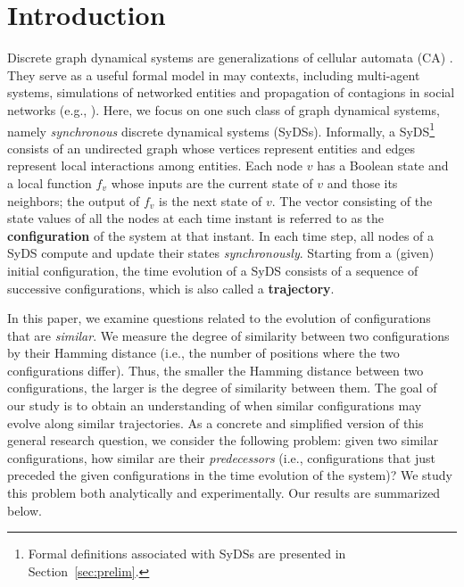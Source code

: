\section{Introduction}
\label{sec:intro}

Discrete graph dynamical systems are
generalizations of cellular automata (CA) \cite{Wol-1987,Gut-1989}.
They serve as a useful formal model in may 
contexts, including  multi-agent systems, 
simulations of networked entities and propagation
of contagions in social networks 
(e.g., \cite{Woo-2002,MR-2007,Valente-1996}).
Here, we focus on one such class of graph dynamical systems,
namely \emph{synchronous} discrete dynamical systems (SyDSs).
Informally,
a SyDS\footnote{Formal definitions associated with SyDSs are presented
in Section~\ref{sec:prelim}.}
 consists of an undirected graph whose vertices represent
entities and edges represent local interactions among entities.
Each node $v$ has a Boolean state and
a local function $f_v$
whose inputs are the current state of $v$ and those its neighbors;
the output of $f_v$ is the next state of $v$.
The vector consisting of the state values of all the nodes at each time instant
is referred to as the \textbf{configuration} of the system at that instant.
In each time step, all nodes of a SyDS compute and update their
states \emph{synchronously}.
Starting from a (given) initial configuration,
the time evolution of a SyDS consists of a
sequence of successive configurations, which is also called a
\textbf{trajectory}.

In this paper, we examine questions related to the evolution
of configurations that are \emph{similar}. 
We measure the degree of similarity between two configurations
by their Hamming distance (i.e., the number of positions
where the two configurations differ). 
Thus, the smaller the Hamming distance between two configurations, 
the larger is the degree of similarity between them. 
The goal of our study is to obtain an
understanding of when similar configurations may evolve along 
similar trajectories.
As a concrete and simplified version of 
this general research question, we consider the
following problem: given two similar configurations, how similar are
their \emph{predecessors} (i.e., configurations that
just preceded the given configurations in 
the time evolution of the system)?
We study this problem both analytically and experimentally. 
Our results are summarized below.


